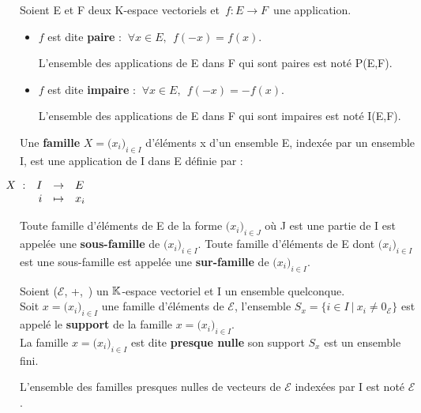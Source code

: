 \noindent Soient E et F deux K-espace vectoriels et \(\,f:E\to F\,\) une application.
\begin{itemize}[leftmargin=1cm, label=•]
\item \(f\) est dite \textbf{paire} \ssi : \(\ \forall x\in E, \ \ f(-x)=f(x)\). \vspace{0.1cm}\\
\begin{small}L'ensemble des applications de E dans F qui sont paires est noté P(E,F). \end{small} 

\item \(f\) est dite \textbf{impaire} \ssi : \(\ \forall x\in E, \ \ f(-x)=-f(x)\). \vspace{0.1cm}\\
\begin{small}L'ensemble des applications de E dans F qui sont impaires est noté I(E,F). \end{small}
\end{itemize}

\vspace{1.3cm}


Une \textbf{famille} \(X=\bigl(x_i\bigr)_{i\in I} \) d'éléments x d'un ensemble E, indexée par un ensemble I, est une application de I dans E définie par :\vspace{-0.77cm}
\begin{center}\(
\begin{array}{rrcl}
    \hspace{-2cm} X\ : & I & \to & E \\
     & i & \mapsto & x_i
\end{array}
\)\end{center}
\vspace{0.2cm}

Toute famille d'éléments de E de la forme \(\bigl(x_i\bigr)_{i\in J}\) où J est une partie de I est appelée une \textbf{sous-famille} de \(\bigl(x_i\bigr)_{i\in I}\). Toute famille d'éléments de E dont \(\bigl(x_i\bigr)_{i\in I}\) est une sous-famille est appelée une \textbf{sur-famille} de \(\bigl(x_i\bigr)_{i\in I}\).

\vspace{1cm}

Soient (\(\mathcal{E}\), +,\ \lce) un \(\mathbb{K}\)-espace vectoriel et I un ensemble quelconque.\\
Soit \(x=\bigl(x_i\bigr)_{i\in I}\) une famille d'éléments de \(\mathcal{E}\), l'ensemble \(S_x=\{i\in I \ | \ x_i \neq 0_{\mathcal{E}} \} \) est appelé le \textbf{support} de la famille \(x=\bigl(x_i\bigr)_{i\in I}\).\\
La famille \(x=\bigl(x_i\bigr)_{i\in I}\) est dite \textbf{presque nulle} \ssi son support \(S_x\) est un ensemble fini.\\
\begin{small}
    L'ensemble des familles presques nulles de vecteurs de $\mathcal{E}$ indexées par I est noté $\mathcal{E}$.
\end{small}


